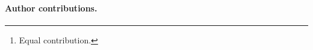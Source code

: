 \documentclass[11pt]{article}
\title{}
\author{%
  Anish Chaudhuri\thanks{Equal contribution.}\\
  Stanford University\\
  \texttt{anishch@stanford.edu}
  \and
  Jessie Dong\footnotemark[1]\\
  Stanford University\\
  \texttt{jessiedong@stanford.edu}
  \and
  Maya Vendhan\footnotemark[1]\\
  Stanford University\\
  \texttt{mvendhan@stanford.edu}}
\date{}
\begin{document}
\maketitle
\begin{abstract}

\end{abstract}









\paragraph{Author contributions.}





\appendix

\end{document}
